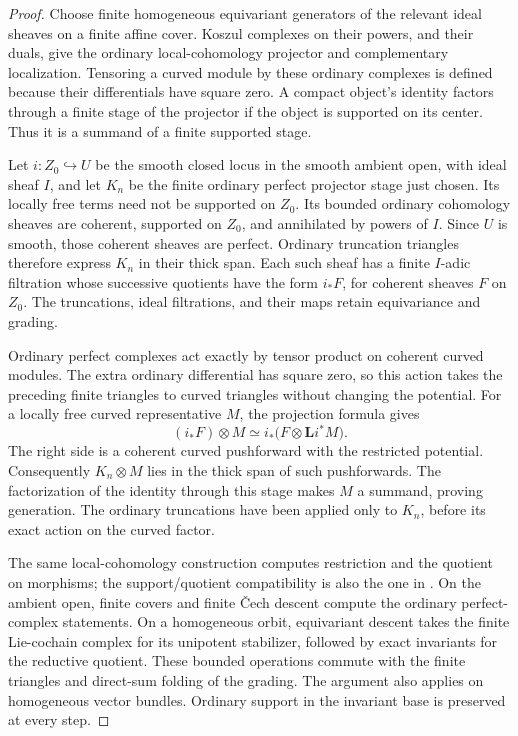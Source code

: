 \begin{proof}
Choose finite homogeneous equivariant generators of the relevant
ideal sheaves on a finite affine cover.  Koszul complexes on their
powers, and their duals, give the ordinary local-cohomology projector
and complementary localization.  Tensoring a curved module by these
ordinary complexes is defined because their differentials have square
zero.  A compact object's identity factors through a finite stage of
the projector if the object is supported on its center.  Thus it is a
summand of a finite supported stage.

Let $i:Z_0\hookrightarrow U$ be the smooth closed locus in the
smooth ambient open, with ideal sheaf $I$, and let $K_n$ be the finite
ordinary perfect projector stage just chosen.  Its locally free terms
need not be supported on $Z_0$.  Its bounded ordinary cohomology
sheaves are coherent, supported on $Z_0$, and annihilated by powers
of $I$.  Since $U$ is smooth, those coherent sheaves are perfect.
Ordinary truncation triangles therefore express $K_n$ in their thick
span.  Each such sheaf has a finite $I$-adic filtration whose
successive quotients have the form $i_*F$, for coherent sheaves $F$
on $Z_0$.  The truncations, ideal filtrations, and their maps retain
equivariance and grading.

Ordinary perfect complexes act exactly by tensor product on coherent
curved modules.  The extra ordinary differential has square zero,
so this action takes the preceding finite triangles to curved
triangles without changing the potential.  For a locally free curved
representative $M$, the projection formula gives
\[
 (i_*F)\otimes M\simeq i_*\bigl(F\otimes\mathbf L i^*M\bigr).
\]
The right side is a coherent curved pushforward with the restricted
potential.  Consequently $K_n\otimes M$ lies in the thick span of
such pushforwards.  The factorization of the identity through this
stage makes $M$ a summand, proving generation.  The ordinary
truncations have been applied only to $K_n$, before its exact action
on the curved factor.

The same local-cohomology construction computes restriction and the
quotient on morphisms; the support/quotient compatibility is also the
one in \cite[Proposition~2.3.9]{Toda}.  On the ambient open, finite
covers and finite \v{C}ech descent compute the ordinary perfect-complex
statements.  On a homogeneous orbit, equivariant descent takes the
finite Lie-cochain complex for its unipotent stabilizer, followed by
exact invariants for the reductive quotient.  These bounded operations
commute with the finite triangles and direct-sum folding of the
grading.  The argument also applies on homogeneous vector bundles.
Ordinary support in the invariant base is preserved at every step.
\end{proof}

